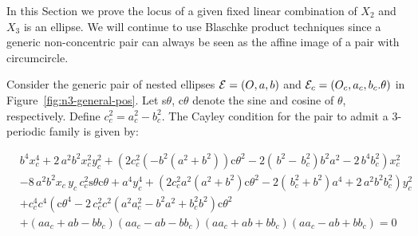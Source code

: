 In this Section we prove the locus of a given fixed linear combination of $X_2$ and $X_3$ is an ellipse. We will continue to use Blaschke product techniques since a generic non-concentric pair can always be seen as the affine image of a pair with circumcircle.

Consider the generic pair of nested ellipses $\mathcal{E}=(O,a,b)$ and $\mathcal{E}_c=(O_c,a_c,b_c.\theta)$ in Figure~\ref{fig:n3-general-pos}. Let s$\theta$, c$\theta$ denote the sine and cosine of $\theta$, respectively. Define $c_c^2=a_c^2-b_c^2$. The Cayley condition for the pair to admit a 3-periodic family is given by:

{\small
\begin{align}
&{b}^{4}x_c^{4}+2\,{a}^{2}{b}^{2}x_c^{2}y_c^{2}+
 \left(  2 c_c^2  \left( -{b}^{2}({a}^{2}+{b}^{2} )\right)  \text{c}\theta^2  - 2\left(  \,b ^{2}- \,b_c
^{2} \right) {b}^{2}{a}^{2}-2\,{b}^{4}b_c^{2} \right)x_c
^{2} \label{eqn:cayley}\\
&-8\,{a}^{2}{b}^{2}x_c\,{  y_c}\,c_c^2 
\text{s}\theta\text{c}\theta  +{a}^{4}y_c^{4} + \left(  2 c_c^2 a^2 \left(
{a}^{2}+{b}^{2}  \right)\text{c}\theta^2  
 -2 \left(  \,b_c^{2}+{b}^{2} \right) {a}^{4}+2
\,{a}^{2}{b}^{2}b_c^{2} \right) y_c^{2} \nonumber\\
&+ c_c^4  c^4  \left( \text{c}\theta^4-2\, c_c^2 c^2
  \left( {a}^{2} a_c^{2}-{b}^{2}{a}^{2}+
b_c^{2}{b}^{2} \right) \text{c}\theta^2 \right. \nonumber\\
 &+ \left( a a_c+a b-b b_c \right)  \left( a a_c
-a b -b b_c \right)  \left( a a_c+a b+b b_c \right)  \left( a
a_c-a b+b b_c \right) = 0\nonumber
\end{align}
}


 
 
 

